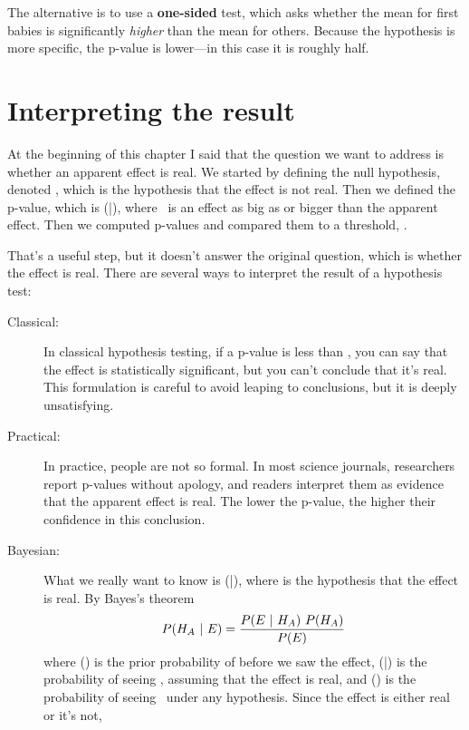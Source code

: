 \documentclass[12pt]{book}
\begin{document}
The alternative is to use a {\bf one-sided} test, which asks whether
the mean for first babies is significantly {\em higher} than
the mean for others.  Because the hypothesis is more specific, the
p-value is lower---in this case it is roughly half.


\section{Interpreting the result}

At the beginning of this chapter I said that the question we want to
address is whether an apparent effect is real.  We started by defining
the null hypothesis, denoted \HH{}, which is the hypothesis that
the effect is not real.  Then we defined the p-value, which is
\Prob(\E|\HH{}), where \E~is an effect as big as or bigger
than the apparent effect.  Then we computed p-values and compared them
to a threshold, \myalpha.

That's a useful step, but it doesn't answer the original question,
which is whether the effect is real.  There are several ways to
interpret the result of a hypothesis test:

\begin{description}

\item[Classical:] In classical hypothesis testing, if a p-value
  is less than \myalpha, you can say that the effect is statistically
  significant, but you can't conclude that it's real.  This
  formulation is careful to avoid leaping to conclusions, but it is
  deeply unsatisfying.

\item[Practical:] In practice, people are not so formal.  In most
  science journals, researchers report p-values without apology, and
  readers interpret them as evidence that the apparent effect is real.
  The lower the p-value, the higher their confidence in this
  conclusion.

\item[Bayesian:] What we really want to know is \Prob(\HH{}|\E), 
  where \HH{} is the hypothesis that the effect is real.  
  By Bayes's theorem
  \[ P(H_A ~|~ E) = \frac{P(E ~|~ H_A) ~ P(H_A)}{P(E)} \]
  where \Prob(\HH{}) is the prior probability of \HH{} before 
  we saw the
  effect, \Prob(\E|\HH{}) is the probability of seeing \E, 
  assuming that
  the effect is real, and \Prob(\E) is the probability of seeing 
  \E~under any hypothesis.  Since the effect is either real or it's not,
  

\end{description}
\end{document}
